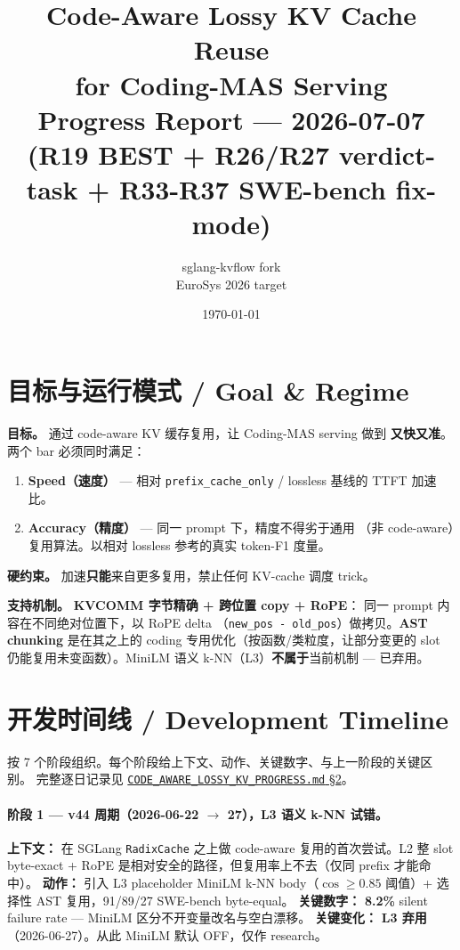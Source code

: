 \documentclass[11pt,a4paper]{article}
\title{\bfseries Code-Aware Lossy KV Cache Reuse\\
       for Coding-MAS Serving\\[6pt]
       \large Progress Report --- 2026-07-07\\[2pt]
       \normalsize (R19 BEST + R26/R27 verdict-task + R33-R37 SWE-bench fix-mode)}
\author{sglang-kvflow fork\\
         \small EuroSys 2026 target}
\date{\today}
\begin{document}
\maketitle
\tableofcontents
\bigskip

\section{目标与运行模式 / Goal \& Regime}

\textbf{目标。} 通过 code-aware KV 缓存复用，让 Coding-MAS serving 做到
\textbf{又快又准}。两个 bar 必须同时满足：
\begin{enumerate}
  \item \textbf{Speed（速度）} --- 相对 \texttt{prefix\_cache\_only} /
        lossless 基线的 TTFT 加速比。
  \item \textbf{Accuracy（精度）} --- 同一 prompt 下，精度不得劣于通用
        （非 code-aware）复用算法。以相对 lossless 参考的真实 token-F1 度量。
\end{enumerate}

\textbf{硬约束。} 加速\textbf{只能}来自更多复用，禁止任何 KV-cache 调度 trick。

\textbf{支持机制。} \textbf{KVCOMM 字节精确 + 跨位置 copy + RoPE}：
同一 prompt 内容在不同绝对位置下，以 RoPE delta
（\texttt{new\_pos - old\_pos}）做拷贝。\textbf{AST chunking}
是在其之上的 coding 专用优化（按函数/类粒度，让部分变更的 slot
仍能复用未变函数）。MiniLM 语义 k-NN（L3）\textbf{不属于}当前机制 ---
已弃用。

\section{开发时间线 / Development Timeline}

按 7 个阶段组织。每个阶段给上下文、动作、关键数字、与上一阶段的关键区别。
完整逐日记录见
\href{file:../results/CODE_AWARE_LOSSY_KV_PROGRESS.md}{\texttt{CODE\_AWARE\_LOSSY\_KV\_PROGRESS.md} \S 2}。

\paragraph{阶段 1 --- v44 周期（2026-06-22 $\to$ 27），L3 语义 k-NN 试错。}
\textbf{上下文：} 在 SGLang \texttt{RadixCache} 之上做 code-aware 复用的首次尝试。L2 整 slot byte-exact + RoPE 是相对安全的路径，但复用率上不去（仅同 prefix 才能命中）。
\textbf{动作：} 引入 L3 placeholder MiniLM k-NN body（$\cos\!\geq\!0.85$ 阈值）+ 选择性 AST 复用，91/89/27 SWE-bench byte-equal。
\textbf{关键数字：} \textbf{8.2\%} silent failure rate --- MiniLM 区分不开变量改名与空白漂移。
\textbf{关键变化：} \textbf{L3 弃用}（2026-06-27）。从此 MiniLM 默认 OFF，仅作 research。
\end{document}
